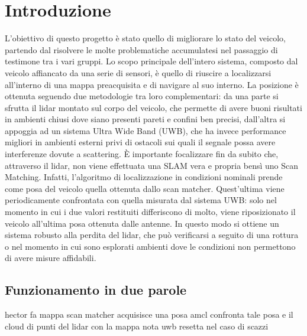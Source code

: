 
\graphicspath{{./figs/}}


	


\newpage\null\thispagestyle{empty}\newpage
\newpage
{}
\setcounter{page}{1}
\tableofcontents
\newpage

%
%


\section*{Introduzione}
L'obiettivo di questo progetto \`e stato quello di migliorare lo stato del veicolo, partendo dal risolvere le molte problematiche accumulatesi nel passaggio di testimone tra i vari gruppi.
Lo scopo principale dell'intero sistema, composto dal veicolo affiancato da una serie di sensori, \`e quello di riuscire a localizzarsi all'interno di una mappa preacquisita e di navigare al suo interno.
La posizione \`e ottenuta seguendo due metodologie tra loro complementari: da una parte si sfrutta il lidar montato sul corpo del veicolo, che permette di avere buoni risultati in ambienti chiusi dove siano presenti pareti e confini ben precisi, dall'altra si appoggia ad un sistema Ultra Wide Band (UWB), che ha invece performance migliori in ambienti esterni privi di ostacoli sui quali il segnale possa avere interferenze dovute a scattering.
\`E importante focalizzare fin da subito che, attraverso il lidar, non viene effettuata una SLAM vera e propria bens\`i uno Scan Matching.
Infatti, l'algoritmo di localizzazione in condizioni nominali prende come posa del veicolo quella ottenuta dallo scan matcher. 
Quest'ultima viene periodicamente confrontata con quella misurata dal sistema UWB: solo nel momento in cui i due valori restituiti differiscono di molto, viene riposizionato il veicolo all'ultima posa ottenuta dalle antenne.
In questo modo si ottiene un sistema robusto alla perdita del lidar, che pu\`o verificarsi a seguito di una rottura o nel momento in cui sono esplorati ambienti dove le condizioni non permettono di avere misure affidabili.

\subsection*{Funzionamento in due parole}
hector fa mappa
scan matcher acquisisce una posa
amcl confronta tale posa e il cloud di punti del lidar con la mappa nota
uwb resetta nel caso di scazzi

